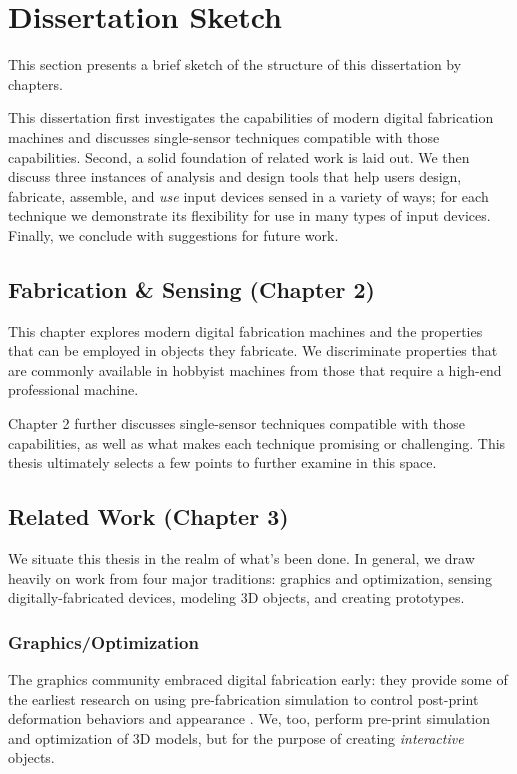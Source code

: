\section{Dissertation Sketch}

This section presents a brief sketch of the structure of this dissertation by chapters.

This dissertation first investigates the capabilities of modern digital fabrication machines and discusses single-sensor techniques compatible with those capabilities. Second, a solid foundation of related work is laid out. We then discuss three instances of analysis and design tools that help users design, fabricate, assemble, and \emph{use} input devices sensed in a variety of ways; for each technique we demonstrate its flexibility for use in many types of input devices. Finally, we conclude with suggestions for future work.

\subsection{Fabrication \& Sensing (Chapter 2)}

This chapter explores modern digital fabrication machines and the properties that can be employed in objects they fabricate. We discriminate properties that are commonly available in hobbyist machines from those that require a high-end professional machine.

Chapter 2 further discusses single-sensor techniques compatible with those capabilities, as well as what makes each technique promising or challenging. This thesis ultimately selects a few points to further examine in this space.

\subsection{Related Work (Chapter 3)}

We situate this thesis in the realm of what's been done. In general, we draw heavily on work from four major traditions: graphics and optimization, sensing digitally-fabricated devices, modeling 3D objects, and creating prototypes.

\subsubsection{Graphics/Optimization}
The graphics community embraced digital fabrication early: they provide some of the earliest research on using pre-fabrication simulation to control post-print deformation behaviors \cite{bickel-deformation} and appearance \cite{lan-appearance}. We, too, perform pre-print simulation and optimization of 3D models, but for the purpose of creating \emph{interactive} objects.


